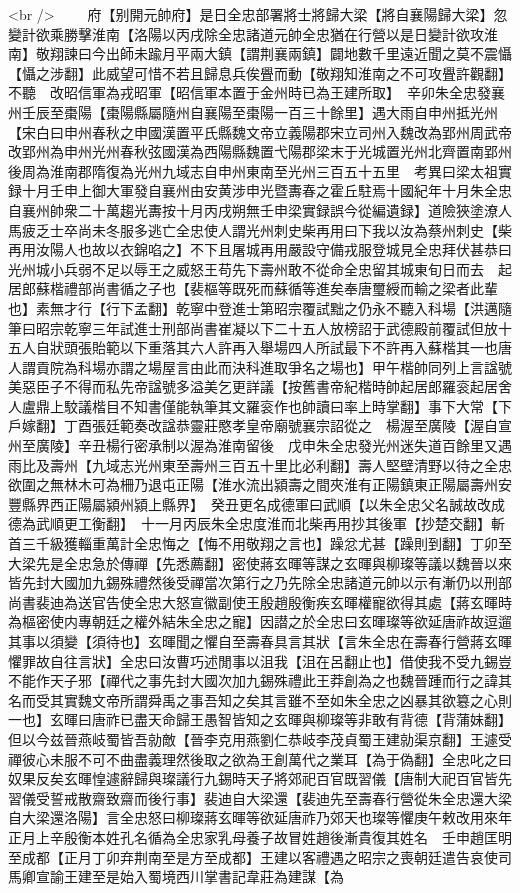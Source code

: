 <br />
　　府【别開元帥府】是日全忠部署將士將歸大梁【將自襄陽歸大梁】忽變計欲乘勝擊淮南【洛陽以丙戌除全忠諸道元帥全忠猶在行營以是日變計欲攻淮南】敬翔諫曰今出師未踰月平兩大鎮【謂荆襄兩鎮】闢地數千里遠近聞之莫不震懾【懾之涉翻】此威望可惜不若且歸息兵俟舋而動【敬翔知淮南之不可攻舋許觀翻】不聽　改昭信軍為戎昭軍【昭信軍本置于金州時已為王建所取】　辛卯朱全忠發襄州壬辰至棗陽【棗陽縣屬隨州自襄陽至棗陽一百三十餘里】遇大雨自申州抵光州【宋白曰申州春秋之申國漢置平氏縣魏文帝立義陽郡宋立司州入魏改為郢州周武帝改郢州為申州光州春秋弦國漢為西陽縣魏置弋陽郡梁末于光城置光州北齊置南郢州後周為淮南郡隋復為光州九域志自申州東南至光州三百五十五里　考異曰梁太祖實録十月壬申上御大軍發自襄州由安黄涉申光暨夀春之霍丘駐焉十國紀年十月朱全忠自襄州帥衆二十萬趨光夀按十月丙戌朔無壬申梁實録誤今從編遺録】道險狹塗潦人馬疲乏士卒尚未冬服多逃亡全忠使人謂光州刺史柴再用曰下我以汝為蔡州刺史【柴再用汝陽人也故以衣錦啗之】不下且屠城再用嚴設守備戎服登城見全忠拜伏甚恭曰光州城小兵弱不足以辱王之威怒王苟先下壽州敢不從命全忠留其城東旬日而去　起居郎蘇楷禮部尚書循之子也【裴樞等既死而蘇循等進矣奉唐璽綬而輸之梁者此輩也】素無才行【行下孟翻】乾寧中登進士第昭宗覆試黜之仍永不聽入科場【洪邁隨筆曰昭宗乾寧三年試進士刑部尚書崔凝以下二十五人放榜詔于武德殿前覆試但放十五人自狀頭張貽範以下重落其六人許再入舉場四人所試最下不許再入蘇楷其一也唐人謂貢院為科場亦謂之場屋言由此而決科進取爭名之場也】甲午楷帥同列上言諡號美惡臣子不得而私先帝諡號多溢美乞更詳議【按舊書帝紀楷時帥起居郎羅衮起居舍人盧鼎上駮議楷目不知書僅能執筆其文羅衮作也帥讀曰率上時掌翻】事下大常【下戶嫁翻】丁酉張廷範奏改諡恭靈莊愍孝皇帝廟號襄宗詔從之　楊渥至廣陵【渥自宣州至廣陵】辛丑楊行密承制以渥為淮南留後　戊申朱全忠發光州迷失道百餘里又遇雨比及壽州【九域志光州東至壽州三百五十里比必利翻】壽人堅壁清野以待之全忠欲圍之無林木可為柵乃退屯正陽【淮水流出潁壽之間夾淮有正陽鎮東正陽屬壽州安豐縣界西正陽屬潁州潁上縣界】　癸丑更名成德軍曰武順【以朱全忠父名誠故改成德為武順更工衡翻】　十一月丙辰朱全忠度淮而北柴再用抄其後軍【抄楚交翻】斬首三千級獲輜重萬計全忠悔之【悔不用敬翔之言也】躁忿尤甚【躁則到翻】丁卯至大梁先是全忠急於傳禪【先悉薦翻】密使蔣玄暉等謀之玄暉與柳璨等議以魏晉以來皆先封大國加九錫殊禮然後受禪當次第行之乃先除全忠諸道元帥以示有漸仍以刑部尚書裴迪為送官告使全忠大怒宣徽副使王殷趙殷衡疾玄暉權寵欲得其處【蔣玄暉時為樞密使内專朝廷之權外結朱全忠之寵】因譛之於全忠曰玄暉璨等欲延唐祚故逗遛其事以須變【須待也】玄暉聞之懼自至壽春具言其狀【言朱全忠在壽春行營蔣玄暉懼罪故自往言狀】全忠曰汝曹巧述閒事以沮我【沮在呂翻止也】借使我不受九錫豈不能作天子邪【禪代之事先封大國次加九錫殊禮此王莽創為之也魏晉踵而行之諱其名而受其實魏文帝所謂舜禹之事吾知之矣其言雖不至如朱全忠之凶暴其欲簒之心則一也】玄暉曰唐祚已盡天命歸王愚智皆知之玄暉與柳璨等非敢有背德【背蒲妹翻】但以今兹晉燕岐蜀皆吾勍敵【晉李克用燕劉仁恭岐李茂貞蜀王建勍渠京翻】王遽受禪彼心未服不可不曲盡義理然後取之欲為王創萬代之業耳【為于偽翻】全忠叱之曰奴果反矣玄暉惶遽辭歸與璨議行九錫時天子將郊祀百官既習儀【唐制大祀百官皆先習儀受誓戒散齋致齋而後行事】裴迪自大梁還【裴迪先至壽春行營從朱全忠還大梁自大梁還洛陽】言全忠怒曰柳璨蔣玄暉等欲延唐祚乃郊天也璨等懼庚午敕改用來年正月上辛殷衡本姓孔名循為全忠家乳母養子故冒姓趙後漸貴復其姓名　壬申趙匡明至成都【正月丁卯弃荆南至是方至成都】王建以客禮遇之昭宗之喪朝廷遣告哀使司馬卿宣諭王建至是始入蜀境西川掌書記韋莊為建謀【為